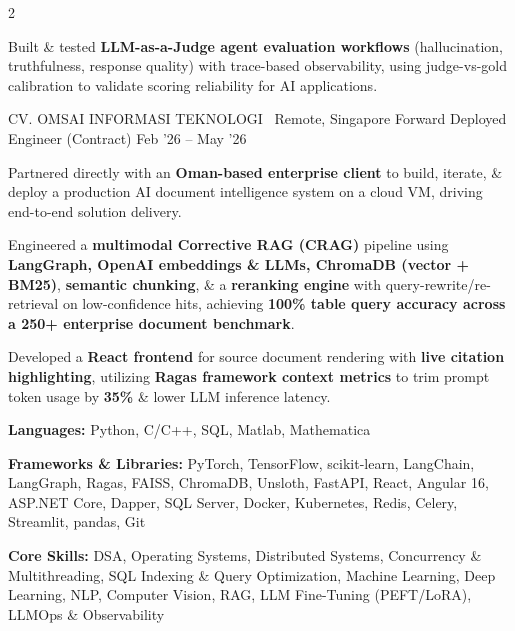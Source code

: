 \documentclass{resume}
\begin{document}
\begin{paracol}{2}
{\begin{resumeItemize}
\item Built \& tested \textbf{LLM-as-a-Judge agent evaluation workflows} (hallucination, truthfulness, response quality) with trace-based observability, using judge-vs-gold calibration to validate scoring reliability for AI applications.
\end{resumeItemize}
}
\resumeExperience
{CV. OMSAI INFORMASI TEKNOLOGI \hfill {\normalfont\small\faMapMarker*\ Remote, Singapore}}
{\textcolor{subheadingblue}{Forward Deployed Engineer (Contract)}}
{Feb '26 -- May '26}
{
\begin{resumeItemize}
\item Partnered directly with an \textbf{Oman-based enterprise client} to build, iterate, \& deploy a production AI document intelligence system on a cloud VM, driving end-to-end solution delivery.

\item Engineered a \textbf{multimodal Corrective RAG (CRAG)} pipeline using \textbf{LangGraph, OpenAI embeddings \& LLMs, ChromaDB (vector + BM25)}, \textbf{semantic chunking}, \& a \textbf{reranking engine} with query-rewrite/re-retrieval on low-confidence hits, achieving \textbf{100\% table query accuracy across a 250+ enterprise document benchmark}.

\item Developed a \textbf{React frontend} for source document rendering with \textbf{live citation highlighting}, utilizing \textbf{Ragas framework context metrics} to trim prompt token usage by \textbf{35\%} \& lower LLM inference latency.
\end{resumeItemize}
}

\begin{resumeItemize}
\item \textbf{Languages:} Python, C/C++, SQL, Matlab, Mathematica
\item \textbf{Frameworks \& Libraries:} PyTorch, TensorFlow, scikit-learn, LangChain, LangGraph, Ragas, FAISS, ChromaDB, Unsloth, FastAPI, React, Angular 16, ASP.NET Core, Dapper, SQL Server, Docker, Kubernetes, Redis, Celery, Streamlit, pandas, Git
\item \textbf{Core Skills:} DSA, Operating Systems, Distributed Systems, Concurrency \& Multithreading, SQL Indexing \& Query Optimization, Machine Learning, Deep Learning, NLP, Computer Vision, RAG, LLM Fine-Tuning (PEFT/LoRA), LLMOps \& Observability
\end{resumeItemize}


\end{paracol}
\end{document}
